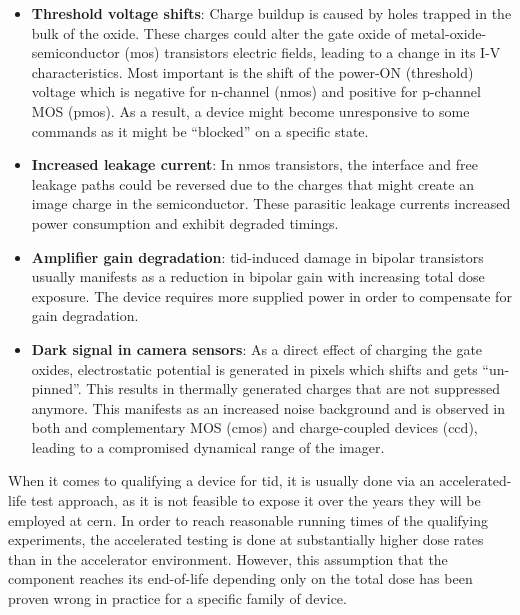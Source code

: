 \documentclass[encoding=utf8,british]{tumphthesis}
\begin{document}
\begin{itemize}
    \item \textbf{Threshold voltage shifts}: Charge buildup is caused by holes trapped in the bulk of the oxide. These charges could alter the gate oxide of metal-oxide-semiconductor (\acrshort{mos}) transistors electric fields, leading to a change in its I-V characteristics. Most important is the shift of the power-ON (threshold) voltage which is negative for n-channel (\acrshort{nmos}) and positive for p-channel MOS  (\acrshort{pmos}). As a result, a device might become unresponsive to some commands as it might be “blocked” on a specific state.

    \item \textbf{Increased leakage current}: In \acrshort{nmos} transistors, the interface and free leakage paths could be reversed due to the charges that might create an image charge in the semiconductor. These parasitic leakage currents increased power consumption and exhibit degraded timings.

    \item \textbf{Amplifier gain degradation}: \acrshort{tid}-induced damage in bipolar transistors usually manifests as a reduction in bipolar gain with increasing total dose exposure. The device requires more supplied power in order to compensate for gain degradation.

    \item \textbf{Dark signal in camera sensors}: As a direct effect of charging the gate oxides, electrostatic potential is generated in pixels which shifts and gets “un-pinned”. This results in thermally generated charges that are not suppressed anymore. This manifests as an increased noise background and is observed in both and complementary MOS  (\acrshort{cmos}) and charge-coupled devices (\acrshort{ccd}), leading to a compromised dynamical range of the imager.
\end{itemize}

When it comes to qualifying a device for \acrshort{tid}, it is usually done via an accelerated-life test approach, as it is not feasible to expose it over the years they will be employed at \acrshort{cern}. In order to reach reasonable running times of the qualifying experiments, the accelerated testing is done at substantially higher dose rates than in the accelerator environment. However, this assumption that the component reaches its end-of-life depending only on the total dose has been proven wrong in practice for a specific family of device.
\end{document}
